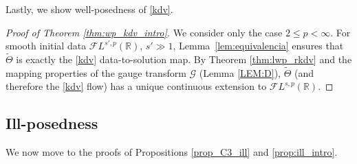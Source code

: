 \documentclass[a4paper,
11pt,  reqno]{amsart}
\newcommand{\5}{\textup{V}}
\newcommand{\FL}{\mathcal{F} L}
\newcommand{\wt}{\widetilde}
\theoremstyle{remark}
\newcommand{\R}{\mathbb{R}}
\newcommand{\Gc}{\mathcal{G}}
\numberwithin{equation}{section}
\numberwithin{theorem}{section}
\begin{document}
{Lastly, we show well-posedness of \eqref{kdv}.}


\begin{proof}[Proof of Theorem \ref{thm:wp_kdv_intro}] We consider only the case $2\le p<\infty$. For smooth initial data $\FL^{s',p}(\R)$, $s'\gg 1$,  Lemma~\ref{lem:equivalencia} ensures that $\wt{\Theta}$ is exactly the \eqref{kdv} data-to-solution map. By Theorem \ref{thm:lwp_rkdv} and the mapping properties of the gauge transform $\Gc$ (Lemma \ref{LEM:D}), $\wt{\Theta}$ (and therefore the \eqref{kdv} flow) has a unique continuous extension to $\FL^{s,p}(\R)$.
\end{proof}


\subsection{Ill-posedness} 
\label{SUBSEC:ill}

We now move to the proofs of Propositions \ref{prop_C3_ill} and \ref{prop:ill_intro}. 
\end{document}
